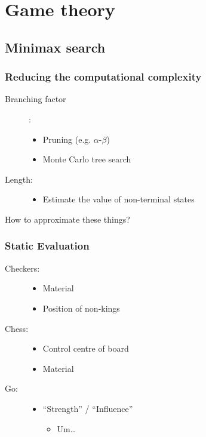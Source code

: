 \documentclass{beamer}
\begin{document}
\section{Game theory}

\subsection{Minimax search}

\begin{frame}
  \frametitle{Reducing the computational complexity}
  \begin{description}
  \item[Branching factor]:\hfill
    \begin{itemize}
    \item Pruning (e.g. $\alpha$-$\beta$)
    \item Monte Carlo tree search
    \end{itemize}
  \item[Length:]\hfill
    \begin{itemize}
    \item Estimate the value of non-terminal states
    \end{itemize}
  \end{description}
  How to approximate these things?
\end{frame}


\begin{frame}
  \frametitle{Static Evaluation}
  \begin{description}
  \item[Checkers:]\hfill
    \begin{itemize}
    \item Material
    \item Position of non-kings
    \end{itemize}
  \item[Chess:]\hfill
    \begin{itemize}
    \item Control centre of board
    \item Material
    \end{itemize}
  \item[Go:]\hfill
    \begin{itemize}
    \item ``Strength'' / ``Influence''
      \begin{itemize}
      \item Um\dots
      \end{itemize}
    \end{itemize}
  \end{description}
\end{frame}
\end{document}
